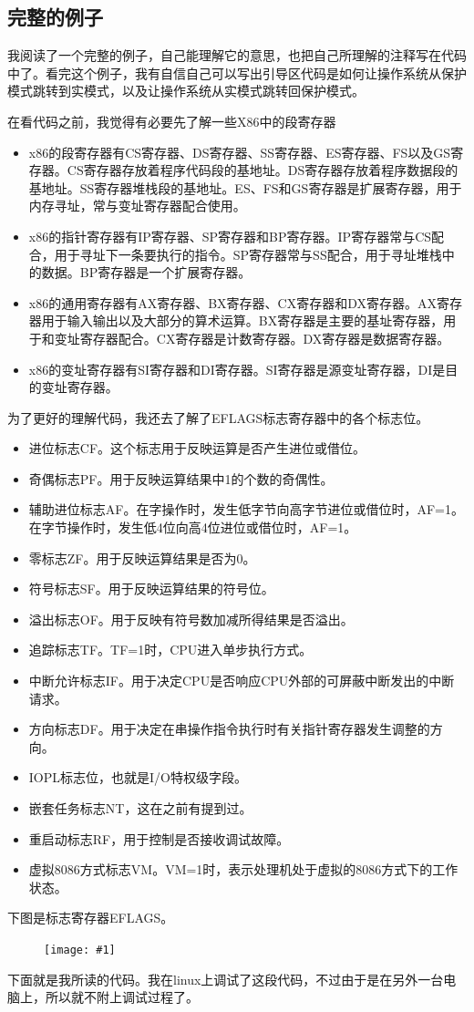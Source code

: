 \documentclass[a4paper,left=2.5cm,right=2.5cm,11pt]{article}
\newcommand{\fic}[1]{\begin{figure}[H]
		\center
		\texttt{[image: \#1]}
	\end{figure}}
\newcommand{\codefile}[1]{}
\begin{document}
\subsection{完整的例子}
	我阅读了一个完整的例子，自己能理解它的意思，也把自己所理解的注释写在代码中了。看完这个例子，我有自信自己可以写出引导区代码是如何让操作系统从保护模式跳转到实模式，以及让操作系统从实模式跳转回保护模式。\par
	在看代码之前，我觉得有必要先了解一些X86中的段寄存器
	\begin{itemize}
		\item x86的段寄存器有CS寄存器、DS寄存器、SS寄存器、ES寄存器、FS以及GS寄存器。CS寄存器存放着程序代码段的基地址。DS寄存器存放着程序数据段的基地址。SS寄存器堆栈段的基地址。ES、FS和GS寄存器是扩展寄存器，用于内存寻址，常与变址寄存器配合使用。
		\item x86的指针寄存器有IP寄存器、SP寄存器和BP寄存器。IP寄存器常与CS配合，用于寻址下一条要执行的指令。SP寄存器常与SS配合，用于寻址堆栈中的数据。BP寄存器是一个扩展寄存器。
		\item x86的通用寄存器有AX寄存器、BX寄存器、CX寄存器和DX寄存器。AX寄存器用于输入输出以及大部分的算术运算。BX寄存器是主要的基址寄存器，用于和变址寄存器配合。CX寄存器是计数寄存器。DX寄存器是数据寄存器。
		\item x86的变址寄存器有SI寄存器和DI寄存器。SI寄存器是源变址寄存器，DI是目的变址寄存器。
	\end{itemize}
	
	为了更好的理解代码，我还去了解了EFLAGS标志寄存器中的各个标志位。
	\begin{itemize}
		\item 进位标志CF。这个标志用于反映运算是否产生进位或借位。
		\item 奇偶标志PF。用于反映运算结果中1的个数的奇偶性。
		\item 辅助进位标志AF。在字操作时，发生低字节向高字节进位或借位时，AF=1。在字节操作时，发生低4位向高4位进位或借位时，AF=1。
		\item 零标志ZF。用于反映运算结果是否为0。
		\item 符号标志SF。用于反映运算结果的符号位。
		\item 溢出标志OF。用于反映有符号数加减所得结果是否溢出。
		\item 追踪标志TF。TF=1时，CPU进入单步执行方式。
		\item 中断允许标志IF。用于决定CPU是否响应CPU外部的可屏蔽中断发出的中断请求。
		\item 方向标志DF。用于决定在串操作指令执行时有关指针寄存器发生调整的方向。
		\item IOPL标志位，也就是I/O特权级字段。
		\item 嵌套任务标志NT，这在之前有提到过。
		\item 重启动标志RF，用于控制是否接收调试故障。
		\item 虚拟8086方式标志VM。VM=1时，表示处理机处于虚拟的8086方式下的工作状态。
	\end{itemize}
	
	下图是标志寄存器EFLAGS。
	\fic{9.png}
	
	下面就是我所读的代码。我在linux上调试了这段代码，不过由于是在另外一台电脑上，所以就不附上调试过程了。
	\codefile{pmtest2.asm}
	
\end{document}
